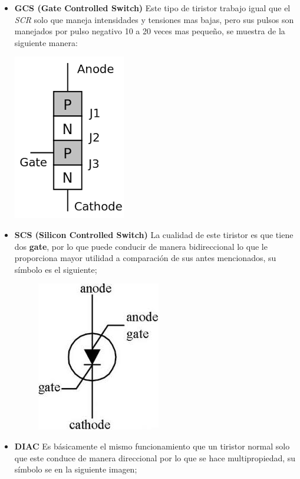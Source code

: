 \documentclass[11pt,a4paper]{article}
\begin{document}
\begin{itemize}
\newpage

\item \textbf{GCS (Gate Controlled Switch)}
Este tipo de tiristor trabajo igual que el \emph{SCR} solo que maneja intensidades y tensiones mas bajas, pero sus pulsos son manejados por pulso negativo 10 a 20 veces mas pequeño, se muestra de la siguiente manera:


\begin{center}
\includegraphics[scale=0.5]{4.png}
\end{center}

\item \textbf{SCS (Silicon Controlled Switch)}
La cualidad de este tiristor es que tiene dos \textbf{gate}, por lo que puede conducir de manera bidireccional lo que le proporciona mayor utilidad a comparación de sus antes mencionados, su símbolo es el siguiente;


\begin{figure}[hbtp]
\centering
\includegraphics[scale=0.5]{5.jpeg} 
\end{figure}


\item \textbf{DIAC}
Es básicamente el mismo funcionamiento que un tiristor normal solo que este conduce de manera direccional por lo que se hace multipropiedad, su símbolo se en la siguiente imagen;


\end{itemize}
\end{document}
